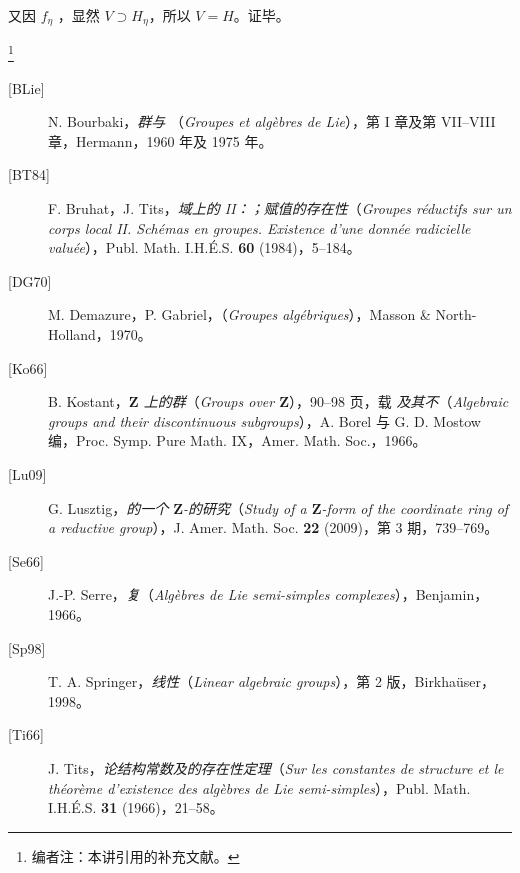 又因 $f_\eta$ ，显然 $V\supset H_\eta$，所以 $V=H$。证毕。

\footnote{编者注：本讲引用的补充文献。}
\begin{description}
\item[{[BLie]}] N. Bourbaki，\emph{群与 }（\emph{Groupes et algèbres de Lie}），第 I 章及第 VII--VIII 章，Hermann，1960 年及 1975 年。
\item[{[BT84]}] F. Bruhat，J. Tits，\emph{域上的 II：；赋值的存在性}（\emph{Groupes réductifs sur un corps local II. Schémas en groupes. Existence d’une donnée radicielle valuée}），Publ. Math. I.H.É.S. \textbf{60} (1984)，5--184。
\item[{[DG70]}] M. Demazure，P. Gabriel，\emph{}（\emph{Groupes algébriques}），Masson \& North-Holland，1970。
\item[{[Ko66]}] B. Kostant，\emph{$\mathbf Z$ 上的群}（\emph{Groups over $\mathbf Z$}），90--98 页，载 \emph{及其不}（\emph{Algebraic groups and their discontinuous subgroups}），A. Borel 与 G. D. Mostow 编，Proc. Symp. Pure Math. IX，Amer. Math. Soc.，1966。
\item[{[Lu09]}] G. Lusztig，\emph{的一个 $\mathbf Z$-的研究}（\emph{Study of a $\mathbf Z$-form of the coordinate ring of a reductive group}），J. Amer. Math. Soc. \textbf{22} (2009)，第 3 期，739--769。
\item[{[Se66]}] J.-P. Serre，\emph{复}（\emph{Algèbres de Lie semi-simples complexes}），Benjamin，1966。
\item[{[Sp98]}] T. A. Springer，\emph{线性}（\emph{Linear algebraic groups}），第 2 版，Birkhaüser，1998。
\item[{[Ti66]}] J. Tits，\emph{论结构常数及的存在性定理}（\emph{Sur les constantes de structure et le théorème d’existence des algèbres de Lie semi-simples}），Publ. Math. I.H.É.S. \textbf{31} (1966)，21--58。
\end{description}
